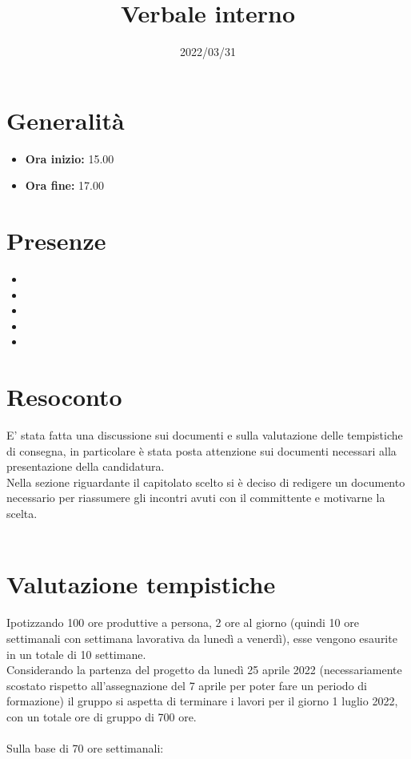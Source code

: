 \documentclass{classes/base}
\title{Verbale interno}
\date{2022/03/31}
\author{\marcob}
\renewcommand{\maketitle}{
    
}
\begin{document}
    \maketitle

    \section*{Generalità}
    \begin{itemize}
        \item \textbf{Ora inizio:} 15.00
        \item \textbf{Ora fine:} 17.00
    \end{itemize}

    \section*{Presenze}
    \begin{itemize}
        \item \marcob
        \item \angela
        \item \giulio
        \item \matteo
        \item \tommaso
    \end{itemize}
    
    \section*{Resoconto}
    E' stata fatta una discussione sui documenti e sulla valutazione delle tempistiche di consegna, in particolare è stata posta attenzione sui documenti necessari alla presentazione della candidatura.\\
    Nella sezione riguardante il capitolato scelto si è deciso di redigere un documento necessario per riassumere gli incontri avuti con il committente e motivarne la scelta.\\\\

    \section*{Valutazione tempistiche}
    Ipotizzando 100 ore produttive a persona, 2 ore al giorno (quindi 10 ore settimanali con settimana lavorativa da lunedì a venerdì), esse vengono esaurite in un totale di 10 settimane.\\
    Considerando la partenza del progetto da lunedì 25 aprile 2022 (necessariamente scostato rispetto all'assegnazione del 7 aprile per poter fare un periodo di formazione) il gruppo si aspetta di terminare i lavori per il giorno 1 luglio 2022, con un totale ore di gruppo di 700 ore.\\\\
    Sulla base di 70 ore settimanali:
\end{document}
